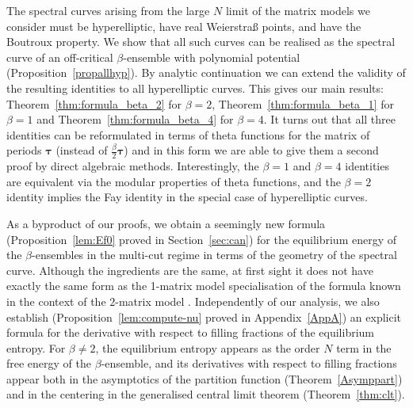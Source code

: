 \documentclass[pdftex]{sigma}
\numberwithin{equation}{section}
\begin{document}
The spectral curves arising from the large $N$ limit of the matrix models we consider must be hyperelliptic, have real Weierstra\ss{} points, and have the Boutroux property. We show that all such curves can be realised as the spectral curve of an off-critical $\beta$-ensemble with polynomial potential (Proposition~\ref{propallhyp}). By analytic continuation we can extend the validity of the resulting identities to all hyperelliptic curves. This gives our main results: Theorem~\ref{thm:formula_beta_2} for $\beta = 2$, Theorem~\ref{thm:formula_beta_1} for $\beta = 1$ and Theorem~\ref{thm:formula_beta_4} for $\beta = 4$. It turns out that all three identities can be reformulated in terms of theta functions for the matrix of periods $\boldsymbol{\tau}$ \big(instead of $\frac{\beta}{2}\bm{\tau}$\big) and in this form we are able to give them a second proof by direct algebraic methods. Interestingly, the $\beta = 1$ and $\beta = 4$ identities are equivalent via the modular properties of theta functions, and the $\beta = 2$ identity implies the Fay identity in the special case of hyperelliptic curves.



As a byproduct of our proofs, we obtain a seemingly new formula (Proposition~\ref{lem:Ef0} proved in Section~\ref{sec:can}) for the equilibrium energy of the $\beta$-ensembles in the multi-cut regime in terms of the geometry of the spectral curve. Although the ingredients are the same, at first sight it does not have exactly the same form as the 1-matrix model specialisation of the formula known in the context of the $2$-matrix model \cite{Bertola}. Independently of our analysis, we also establish (Proposition~\ref{lem:compute-nu} proved in Appendix~\ref{AppA}) an explicit formula for the derivative with respect to filling fractions of the equilibrium entropy. For $\beta \neq 2$, the equilibrium entropy appears as the order $N$ term in the free energy of the $\beta$-ensemble, and its derivatives with respect to filling fractions appear both in the asymptotics of the partition function (Theorem~\ref{Asymppart}) and in the centering in the generalised central limit theorem (Theorem~\ref{thm:clt}).
\end{document}
